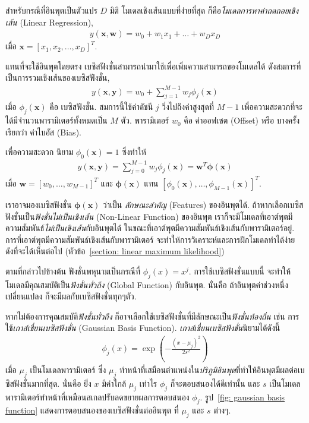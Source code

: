 สำหรับกรณีที่อินพุตเป็นตัวแปร $D$ มิติ 
โมเดลเชิงเส้นแบบที่ง่ายที่สุด ก็คือ\textit{โมเดลการหาค่าถดถอยเชิงเส้น} (Linear Regression),
\begin{eqnarray}
   y(\mathbf{x}, \mathbf{w}) = w_0 + w_1 x_1 + \ldots + w_D x_D 
\label{eq: linear regression}
\end{eqnarray}
เมื่อ $\mathbf{x} = [x_1, x_2, \ldots, x_D]^T$.

แทนที่จะใช้อินพุตโดยตรง เบซิสฟังชั่นสามารถนำมาใช้เพื่อเพิ่มความสามารถของโมเดลได้
ดังสมการที่เป็นการรวมเชิงเส้นของเบซิสฟังชั่น,
\begin{eqnarray}
   y(\mathbf{x}, \mathbf{y}) = w_0 + \sum_{j=1}^{M-1} w_j \phi_j(\mathbf{x})
\label{eq: linear regression model}
\end{eqnarray}
เมื่อ $\phi_j(\mathbf{x})$ คือ เบซิสฟังชั่น.
สมการนี้ใช้ค่าดัชนี $j$ วิ่งไปถึงค่าสูงสุดที่ $M-1$ เพื่อความสะดวกที่จะได้มีจำนวนพารามิเตอร์ทั้งหมดเป็น $M$ ตัว.
พารามิเตอร์ $w_0$ คือ ค่าออฟเซต (Offset) หรือ บางครั้งเรียกว่า ค่าไบอัส (Bias).

เพื่อความสะดวก นิยาม $\phi_0(\mathbf{x}) = 1$ ซึ่งทำให้
\begin{eqnarray}
   y(\mathbf{x}, \mathbf{y}) = \sum_{j=0}^{M-1} w_j \phi_j(\mathbf{x}) = \mathbf{w}^T \bm{\phi}(\mathbf{x})
\label{eq: linear regression model short}
\end{eqnarray}
เมื่อ $\mathbf{w} = [w_0, \ldots, w_{M-1}]^T$ และ $\bm{\phi}(\mathbf{x})$ แทน $[\phi_0(\mathbf{x}), \ldots, \phi_{M-1}(\mathbf{x})]^T$.

เราอาจมองเบซิสฟังชั่น $\bm{\phi}(\mathbf{x})$ ว่าเป็น \textit{ลักษณะสำคัญ} (Features) ของอินพุตได้.
ถ้าหากเลือกเบซิสฟังชั่นเป็น\textit{ฟังชั่นไม่เป็นเชิงเส้น} (Non-Linear Function) ของอินพุต เราก็จะมีโมเดลที่เอาต์พุตมีความสัมพันธ์\textit{ไม่เป็นเชิงเส้น}กับอินพุตได้ ในขณะที่เอาต์พุตมีความสัมพันธ์เชิงเส้นกับพารามิเตอร์อยู่.
การที่เอาต์พุตมีความสัมพันธ์เชิงเส้นกับพารามิเตอร์ จะทำให้การวิเคราะห์และการฝึกโมเดลทำได้ง่าย ดังที่จะได้เห็นต่อไป (หัวข้อ~\ref{section: linear maximum likelihood})

ตามที่กล่าวไปข้างต้น ฟังชั่นพหุนามเป็นกรณีที่ $\phi_j(x) = x^j$.
การใช้เบซิสฟังชั่นแบบนี้ จะทำให้โมเดลมีคุณสมบัติเป็น\textit{ฟังชั่นทั่วถึง} (Global Function) กับอินพุต. 
นั่นคือ ถ้าอินพุตค่าช่วงหนึ่งเปลี่ยนแปลง ก็จะมีผลกับเบซิสฟังชั่นทุกๆตัว.

หากไม่ต้องการคุณสมบัติ\textit{ฟังชั่นทั่วถึง} %
ก็อาจเลือกใช้เบซิสฟังชั่นที่มีลักษณะเป็น\textit{ฟังชั่นท้องถิ่น}
เช่น การใช้\textit{เกาส์เชี่ยนเบซิสฟังชั่น} (Gaussian Basis Function).
%
\textit{เกาส์เชี่ยนเบซิสฟังชั่น}นิยามได้ดังนี้
\begin{eqnarray}
   \phi_j(x) = \exp \left( -\frac{(x - \mu_j)^2}{2 s^2} \right)
\label{eq: gaussian basis function}
\end{eqnarray}
เมื่อ $\mu_j$ เป็นโมเดลพารามิเตอร์ 
ซึ่ง $\mu_j$ ทำหน้าที่เสมือนตำแหน่งใน\textit{ปริภูมิอินพุต}ที่ทำให้อินพุตมีผลต่อเบซิสฟังชั่นมากที่สุด.
นั่นคือ ยิ่่ง $x$ มีค่าใกล้ $\mu_j$ เท่าไร $\phi_j$ ก็จะตอบสนองได้ดีเท่านั้น 
และ $s$ เป็นโมเดลพารามิเตอร์ทำหน้าที่เหมือนสเกลปรับลดขยายผลการตอบสนอง $\phi_j$.
รูป~\ref{fig: gaussian basis function} แสดงการตอบสนองของเบซิสฟังชั่นต่ออินพุต ที่ $\mu_j$ และ $s$ ต่างๆ.

